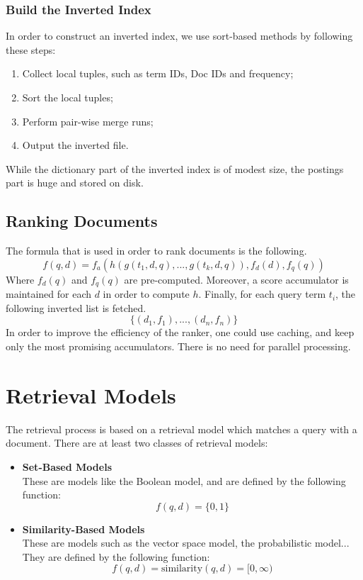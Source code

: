 \documentclass{article}
\begin{document}
\subsubsection{Build the Inverted Index}
In order to construct an inverted index, we use sort-based methods by following these steps:

\begin{enumerate}
	\item Collect local tuples, such as term IDs, Doc IDs and frequency;
	\item Sort the local tuples;
	\item Perform pair-wise merge runs;
	\item Output the inverted file.
\end{enumerate}
While the dictionary part of the inverted index is of modest size, the postings part is huge and stored on disk.

\subsection{Ranking Documents}
The formula that is used in order to rank documents is the following.
\[ f(q, d) = f_a (h (g (t_1, d, q), ..., g (t_k, d, q)), f_d(d), f_q(q)) \]
Where $f_d(q)$ and $f_q(q)$ are pre-computed. Moreover, a score accumulator is maintained for each $d$ in order to compute $h$. Finally, for each query term $t_i$, the following inverted list is fetched.
\[ \{ (d_1, f_1), ..., (d_n, f_n) \} \]
In order to improve the efficiency of the ranker, one could use caching, and keep only the most promising accumulators. There is no need for parallel processing.

\section{Retrieval Models}
The retrieval process is based on a retrieval model which matches a query with a document. There are at least two classes of retrieval models:

\begin{itemize}
	\item \textbf{Set-Based Models}
	\vspace{.2cm} \\
	These are models like the Boolean model, and are defined by the following function:
	\[ f(q, d) = \{ 0,1 \} \]
	
	\item \textbf{Similarity-Based Models}
	\vspace{.2cm} \\
	These are models such as the vector space model, the probabilistic model... They are defined by the following function:
	\[ f(q,d) = \text{similarity}(q, d) = [0, \infty) \]
\end{itemize}
\end{document}
